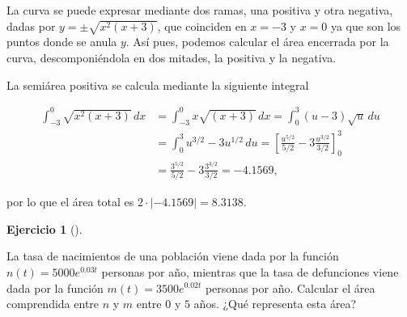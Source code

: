 \documentclass[
  spanish,
  a4paper,
]{scrreport}
\theoremstyle{definition}
\newtheorem{exercise}{Ejercicio}[chapter]
\theoremstyle{remark}
\begin{document}
\begin{tcolorbox}[enhanced jigsaw, arc=.35mm, bottomrule=.15mm, bottomtitle=1mm, breakable, colback=white, colbacktitle=quarto-callout-tip-color!10!white, colframe=quarto-callout-tip-color-frame, coltitle=black, left=2mm, leftrule=.75mm, opacityback=0, opacitybacktitle=0.6, rightrule=.15mm, title=\textcolor{quarto-callout-tip-color}{\faLightbulb}\hspace{0.5em}{Solución}, titlerule=0mm, toprule=.15mm, toptitle=1mm]

La curva se puede expresar mediante dos ramas, una positiva y otra
negativa, dadas por \(y=\pm \sqrt{x^2(x+3)}\), que coinciden en \(x=-3\)
y \(x=0\) ya que son los puntos donde se anula \(y\). Así pues, podemos
calcular el área encerrada por la curva, descomponiéndola en dos
mitades, la positiva y la negativa.

La semiárea positiva se calcula mediante la siguiente integral

\begin{align*}
\int_{-3}^0 \sqrt{x^2(x+3)}\,dx 
&= \int_{-3}^0 x\sqrt{(x+3)}\,dx 
= \int_0^3 (u-3)\sqrt{u}\,du  \tag{Cambio $u=x+3$} \\
&= \int_0^3 u^{3/2}-3u^{1/2}\,du 
= \left[\frac{u^{5/2}}{5/2}-3\frac{u^{3/2}}{3/2}\right]_{0}^3 \\
&= \frac{3^{5/2}}{5/2} - 3\frac{3^{3/2}}{3/2}
= -4.1569,
\end{align*}

por lo que el área total es \(2\cdot |-4.1569| = 8.3138\).

\end{tcolorbox}

\begin{exercise}[]\protect\hypertarget{exr-crecimiento-población}{}\label{exr-crecimiento-población}

La tasa de nacimientos de una población viene dada por la función
\(n(t)=5000e^{0.03t}\) personas por año, mientras que la tasa de
defunciones viene dada por la función \(m(t)=3500 e^{0.02t}\) personas
por año. Calcular el área comprendida entre \(n\) y \(m\) entre \(0\) y
\(5\) años. ¿Qué representa esta área?

\end{exercise}
\end{document}
